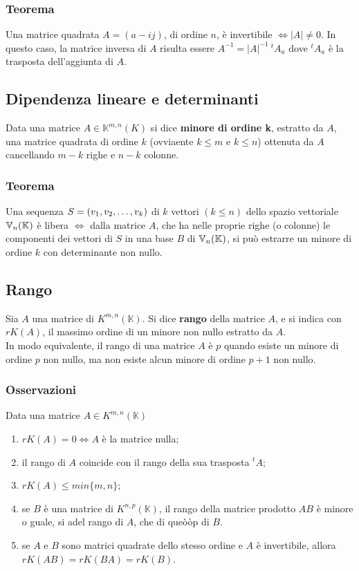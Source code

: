 \documentclass[../main.tex]{subfiles}
\begin{document}
\subsubsection{Teorema}
Una matrice quadrata $A = (a-{ij})$, di ordine $n$, è invertibile
$\iff|A|\ne0$. In questo caso, la matrice inversa di $A$ risulta essere
$A^{-1}=|A|^{-1}\ {^{t}A_a}$ dove ${^{t}A_a}$ è la trasposta dell'aggiunta di
$A$.

\subsection{Dipendenza lineare e determinanti}
Data una matrice $A\in{\mathbb{K}^{m,n}} (K)$ si dice \textbf{minore di ordine
    k}, estratto da $A$, una matrice quadrata di ordine $k$ (ovviaente $k\leq{m}$ e
$k\leq{n}$) ottenuta da $A$ cancellando $m-k$ righe e $n-k$ colonne.\\

\subsubsection{Teorema}
Una sequenza $S = (v_1, v_2, \ldots, v_{k})$ di $k$ vettori $ (k\leq{n})$ dello spazio
vettoriale $\mathbb{V}_n (\mathbb{K})$ è libera $\iff$ dalla matrice $A$, che ha nelle proprie
righe (o colonne) le componenti dei vettori di $S$ in una base $B$ di $\mathbb{V}_n (\mathbb{K})$,
si può estrarre un minore di ordine $k$ con determinante non nullo.

\subsection{Rango}
Sia $A$ una matrice di $K^{m,n} (\mathbb{K})$. Si dice \textbf{rango} della
matrice $A$, e si indica con $rK (A)$, il massimo ordine di un minore non nullo
estratto da $A$.\\ In modo equivalente, il rango di una matrice $A$ è $p$
quando esiste un minore di ordine $p$ non nullo, ma non esiste alcun minore di
ordine $p+1$ non nullo.\\

\subsubsection{Osservazioni}
Data una matrice $A \in K^{m,n} (\mathbb{K})$
\begin{enumerate}
    \item $rK (A) = 0\iff{} A$ è la matrice nulla;
    \item il rango di $A$ coincide con il rango della sua trasposta ${^{t}A}$;
    \item $rK (A) \leq min\{m,n\}$;
    \item se $B$ è una matrice di $K^{n,p} (\mathbb{K})$, il rango della matrice prodotto
          $AB$ è minore o guale, si adel rango di $A$, che di queòòp di $B$.
    \item se $A$ e $B$ sono matrici quadrate dello stesso ordine e $A$ è invertibile,
          allora $rK (AB) = rK (BA) = rK (B)$.
\end{enumerate}
\end{document}
